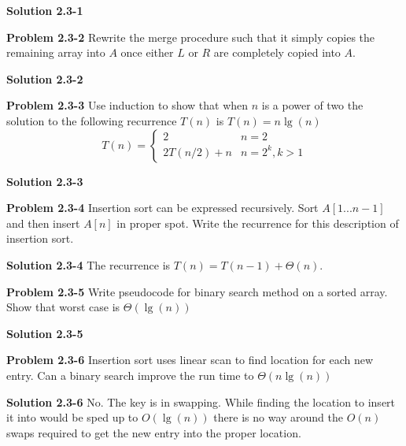 \documentclass{article}
\begin{document}
\medskip

\textbf{Solution 2.3-1}

\hrulefill

\medskip

\textbf{Problem 2.3-2} Rewrite the merge procedure such that it simply copies the remaining array into $A$ once either $L$ or $R$ are completely copied into $A$.

\medskip

\textbf{Solution 2.3-2}

\hrulefill

\medskip

\textbf{Problem 2.3-3} Use induction to show that when $n$ is a power of two the solution to the following recurrence $T(n)$ is $T(n) = n\lg(n)$
\[ T(n) = 
\begin{cases} 
	2 & n = 2 \\
    2T(n/2) + n & n = 2^k, k > 1
\end{cases}
\]

\medskip

\textbf{Solution 2.3-3}

\hrulefill

\medskip

\textbf{Problem 2.3-4} Insertion sort can be expressed recursively. Sort $A[1...n-1]$ and then insert $A[n]$ in proper spot. Write the recurrence for this description of insertion sort.

\medskip

\textbf{Solution 2.3-4} The recurrence is $T(n) = T(n-1) + \Theta(n)$.

\hrulefill

\medskip

\textbf{Problem 2.3-5} Write pseudocode for binary search method on a sorted array. Show that worst case is $\Theta(\lg(n))$

\medskip

\textbf{Solution 2.3-5}

\hrulefill

\medskip

\textbf{Problem 2.3-6} Insertion sort uses linear scan to find location for each new entry. Can a binary search improve the run time to $\Theta(n\lg(n))$

\medskip

\textbf{Solution 2.3-6} No. The key is in swapping. While finding the location to insert it into would be sped up to $O(\lg(n))$ there is no way around the $O(n)$ swaps required to get the new entry into the proper location.
\end{document}
